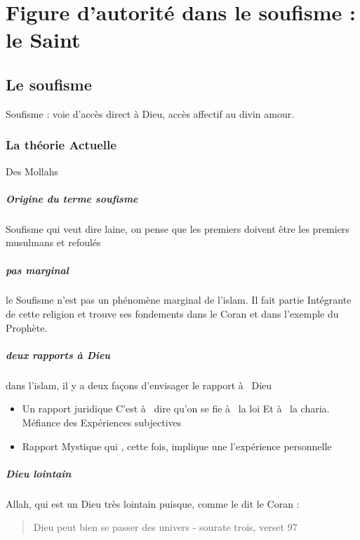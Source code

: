 \chapter{Figure d'autorité dans le soufisme : le Saint}

\section{Le soufisme}

 
Soufisme : voie d'accès direct à Dieu, accès affectif au divin amour. 
\subsection{
La théorie 
Actuelle }

Des 
Mollahs 
 

\paragraph{Origine du terme soufisme}
Soufisme qui  veut dire laine, on pense que les premiers doivent 
être les premiers musulmans et refoulés 
 

\paragraph{pas marginal}   le 
Soufisme n'est pas un phénomène 
marginal de l'islam.  Il fait partie 
Intégrante de cette religion et trouve ses fondements dans le Coran et dans l'exemple du Prophète. 

\paragraph{deux rapports à Dieu} dans l'islam, il y a deux façons d'envisager le rapport à  Dieu 
\begin{itemize}
    \item   
Un rapport juridique  C'est à  dire qu'on se fie à  la loi 
Et à  la charia. Méfiance des
Expériences subjectives 
\item 
Rapport 
Mystique qui , cette fois, implique une l'expérience personnelle 
\end{itemize}



 

\paragraph{Dieu lointain } Allah, qui  est un Dieu très lointain puisque, comme le dit le Coran :
\begin{quote}
    Dieu peut bien se passer des univers  - sourate trois, verset 97 
\end{quote}
 
